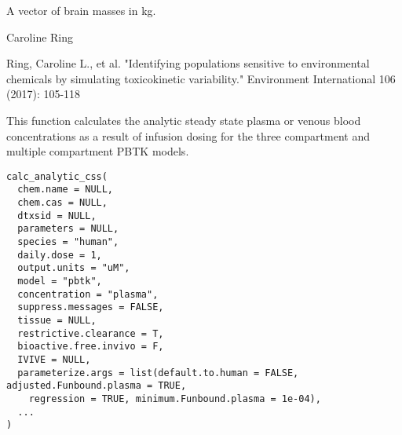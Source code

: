 \documentclass[a4paper]{book}
\begin{document}
%
\begin{Value}
A vector of brain masses in kg.
\end{Value}
%
\begin{Author}\relax
Caroline Ring
\end{Author}
%
\begin{References}\relax
Ring, Caroline L., et al. "Identifying populations sensitive to
environmental chemicals by simulating toxicokinetic variability."
Environment International 106 (2017): 105-118
\end{References}
%
\begin{Description}\relax
This function calculates the analytic steady state plasma or venous blood 
concentrations as a result of infusion dosing for the three compartment and 
multiple compartment PBTK models.
\end{Description}
%
\begin{Usage}
\begin{verbatim}
calc_analytic_css(
  chem.name = NULL,
  chem.cas = NULL,
  dtxsid = NULL,
  parameters = NULL,
  species = "human",
  daily.dose = 1,
  output.units = "uM",
  model = "pbtk",
  concentration = "plasma",
  suppress.messages = FALSE,
  tissue = NULL,
  restrictive.clearance = T,
  bioactive.free.invivo = F,
  IVIVE = NULL,
  parameterize.args = list(default.to.human = FALSE, adjusted.Funbound.plasma = TRUE,
    regression = TRUE, minimum.Funbound.plasma = 1e-04),
  ...
)
\end{verbatim}
\end{Usage}
%
\end{document}
